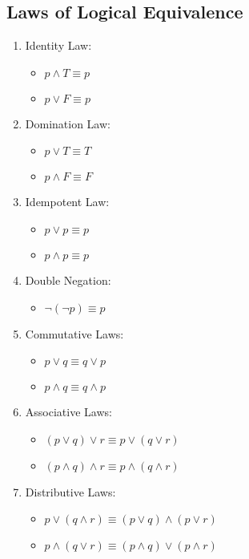 \documentclass{math}
\begin{document}
\subsection*{Laws of Logical Equivalence}
\begin{enumerate}
  \item Identity Law:
  \begin{itemize}
    \item \( p \wedge T \equiv p \)
    \item \( p \vee F \equiv p \)
  \end{itemize}
  \item Domination Law:
  \begin{itemize}
    \item \( p \vee T \equiv T \)
    \item \( p \wedge F \equiv F \)
  \end{itemize}
  \item Idempotent Law:
  \begin{itemize}
    \item \( p \vee p \equiv p \)
    \item \( p \wedge p \equiv p \)
  \end{itemize}
  \item Double Negation:
  \begin{itemize}
    \item \( \neg{(\neg{p})} \equiv p \)
  \end{itemize}
  \item Commutative Laws:
  \begin{itemize}
    \item \( p \vee q \equiv q \vee p \)
    \item \( p \wedge q \equiv q \wedge p \)
  \end{itemize}
  \item Associative Laws:
  \begin{itemize}
    \item \( (p \vee q) \vee r \equiv p \vee (q \vee r) \)
    \item \( (p \wedge q) \wedge r \equiv p \wedge (q \wedge r) \)
  \end{itemize}
  \item Distributive Laws:
  \begin{itemize}
    \item \( p \vee (q \wedge r) \equiv (p \vee q) \wedge (p \vee r) \)
    \item \( p \wedge (q \vee r) \equiv (p \wedge q) \vee (p \wedge r) \)
  \end{itemize}

\end{enumerate}
\end{document}
